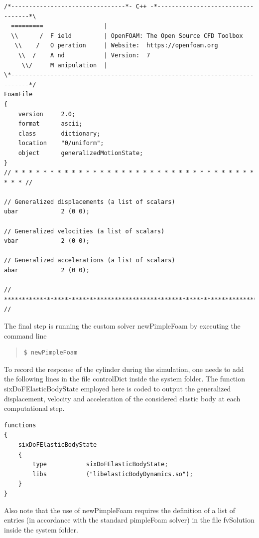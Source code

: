 \begin{lstlisting}
/*--------------------------------*- C++ -*----------------------------------*\
  =========                 |
  \\      /  F ield         | OpenFOAM: The Open Source CFD Toolbox
   \\    /   O peration     | Website:  https://openfoam.org
    \\  /    A nd           | Version:  7
     \\/     M anipulation  |
\*---------------------------------------------------------------------------*/
FoamFile
{
    version     2.0;
    format      ascii;
    class       dictionary;
    location    "0/uniform";
    object      generalizedMotionState;
}
// * * * * * * * * * * * * * * * * * * * * * * * * * * * * * * * * * * * * * //

// Generalized displacements (a list of scalars)
ubar            2 (0 0);

// Generalized velocities (a list of scalars)
vbar            2 (0 0);

// Generalized accelerations (a list of scalars)
abar            2 (0 0);

// ************************************************************************* //
\end{lstlisting}

The final step is running the custom solver newPimpleFoam by executing the command line

\begin{quote}
\begin{verbatim}
$ newPimpleFoam
\end{verbatim}
\end{quote}

\noindent To record the response of the cylinder during the simulation, one needs to add the following lines in the file controlDict inside the system folder. The function sixDoFElasticBodyState employed here is coded to output the generalized displacement, velocity and acceleration of the considered elastic body at each computational step.

\begin{lstlisting}
functions
{
    sixDoFElasticBodyState
    {
        type           sixDoFElasticBodyState;
        libs           ("libelasticBodyDynamics.so");
    }
}
\end{lstlisting}

\noindent Also note that the use of newPimpleFoam requires the definition of a list of entries (in accordance with the standard pimpleFoam solver) in the file fvSolution inside the system folder.


